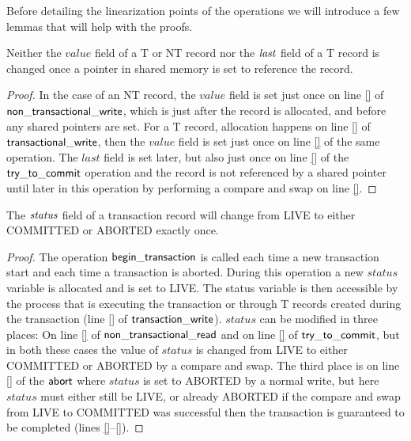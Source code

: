 Before detailing the linearization points of the operations we will introduce a few lemmas that will help
with the proofs.

\begin{lemma}
\label{lemma:si-nochange}
Neither the $\mathit{value}$ field of a T or NT record nor the $\ms{last}$ field of a T record is changed once a pointer in shared memory is set to 
reference the record.
\end{lemma}
\begin{proof}
In the case of an NT record, the $\mathit{value}$ field is set just once on line \ref{} of $\sf{non\_transactional\_write}$,
which is just after the record is allocated, and before any shared pointers are set.
For a T record, allocation happens on line \ref{} of $\sf{transactional\_write}$,
then the $\mathit{value}$ field is set just once on line \ref{} of the same operation.
The $\mathit{last}$ field is set later, but also just once on line \ref{} of the $\sf{try\_to\_commit}$ operation
and the record is not referenced by a shared pointer until later in this operation
by performing a compare and swap on line \ref{}.
\end{proof}


\begin{lemma}
\label{lemma:si-statusonce}
The $\ms{status}$ field of a transaction record will change from LIVE to either COMMITTED or ABORTED
exactly once.
\end{lemma}
\begin{proof}
The operation $\sf{begin\_transaction}$ is called each time a new transaction start and each time a transaction is aborted.
During this operation a new $\mathit{status}$ variable is allocated and is set to LIVE.
The status variable is then accessible by the process that is executing the transaction or through T records created during the
transaction (line \ref{} of $\sf{transaction\_write}$).
$\mathit{status}$ can be modified in three places:
On line \ref{} of $\sf{non\_transactional\_read}$ and on line \ref{} of $\sf{try\_to\_commit}$, but in both these cases
the value of $\mathit{status}$ is changed from LIVE to either COMMITTED or ABORTED by a compare and swap.
The third place is on line \ref{} of the $\sf{abort}$ where $\mathit{status}$ is set to ABORTED by a normal write, but
here $\mathit{status}$ must either still be LIVE, or already ABORTED if the compare and swap from LIVE to COMMITTED was
successful then the transaction is guaranteed to be completed (lines \ref{}--\ref{}).
\end{proof}


